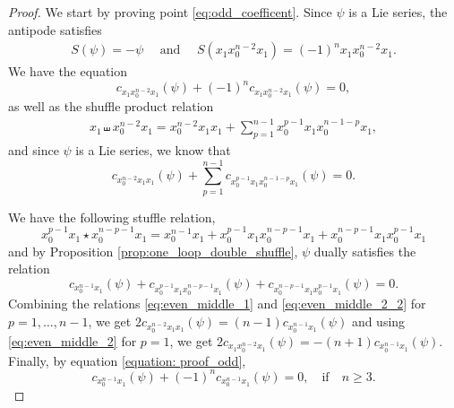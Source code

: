 \documentclass[a4paper,fleqn]{cas-sc}
\begin{document}
\begin{proof}
We start by proving point \eqref{eq:odd_coefficent}.	Since $\psi$ is a Lie series, the antipode satisfies 
\begin{align*}
    S(\psi)=-\psi \quad \text{ and } \quad S(x_1x^{n-2}_0x_1)=(-1)^{{n}}x_1x^{n-2}_0x_1.
\end{align*}
We have the equation
\begin{equation}\label{equation: proof_odd}
	c_{x_1x^{n-2}_0x_1}(\psi)+(-1)^{n}c_{x_1x^{n-2}_0x_1}(\psi)=0,
\end{equation}
as well as the shuffle product relation
\begin{align*}
	x_1\shuffle x^{n-2}_0x_1=x^{n-2}_0x_1x_1+\sum_{p=1}^{n-1}x^{p-1}_0x_1x^{n-1-p}_0x_1,
\end{align*}
and since $\psi$ is a Lie series, we know that
\begin{equation}\label{eq:even_middle_1}
	c_{x^{n-2}_0x_1x_1}(\psi)+\sum_{p=1}^{n-1}c_{x^{p-1}_0x_1x^{n-1-p}_0x_1}(\psi)=0.
\end{equation}

We have the following stuffle relation,
\begin{equation}\label{eq:even_middle_2}
	x^{p-1}_0x_1\star x^{n-p-1}_0x_1=x^{n-1}_0x_1+x^{p-1}_0x_1 x^{n-p-1}_0x_1+x^{n-p-1}_0x_1x^{p-1}_0x_1
\end{equation}
and by Proposition \ref{prop:one_loop_double_shuffle}, $\psi$ dually satisfies the relation
\begin{equation}\label{eq:even_middle_2_2}
	c_{x^{n-1}_0x_1}(\psi)+c_{x^{p-1}_0x_1 x^{n-p-1}_0x_1}(\psi)+c_{x^{n-p-1}_0x_1x^{p-1}_0x_1}(\psi)=0.
\end{equation}
Combining the relations \eqref{eq:even_middle_1} and  \eqref{eq:even_middle_2_2} for $p=1,\dots,n-1$, we get
$
	2c_{x^{n-2}_0x_1x_1}(\psi)=(n-1)c_{x^{n-1}_0x_1}(\psi)
$
and using \eqref{eq:even_middle_2} for $p=1$, we get $2c_{x_1x^{n-2}_0x_1}(\psi)=-(n+1)c_{x^{n-1}_0x_1}(\psi)$.
Finally, by equation \eqref{equation: proof_odd},
$$
	c_{x^{n-1}_0x_1}(\psi)+(-1)^nc_{x^{n-1}_0x_1}(\psi)=0,\quad \text{if}\quad n\ge 3.
$$


\end{proof}
\end{document}
